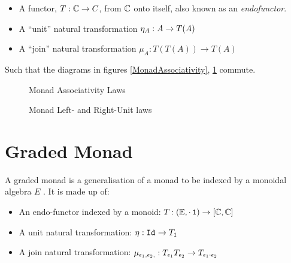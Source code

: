 \documentclass{Report}
\begin{document}
\begin{itemize}
    \item A functor, $T: \mathbb{C} \rightarrow C$, from $\mathbb{C}$ onto itself, also known as an \textit{endofunctor}.
    \item A ``unit'' natural transformation $\eta_{A}: A\rightarrow T(A)$
    \item A ``join'' natural transformation $\mu_{A}: T(T(A)) \rightarrow T(A)$
\end{itemize}

Such that the diagrams in figures \ref{MonadAssociativity}, \ref{MonadUnits} commute.


\begin{figure}
    \centering
    \begin{minipage}{0.45\textwidth}
        \label{MonadAssociativity}
        \centering
                \caption{Monad Associativity Laws}
    \end{minipage}\hfill
    \begin{minipage}{0.45\textwidth}
        \centering
        \label{MonadUnits}
        \caption{Monad Left- and Right-Unit laws}
    \end{minipage}
\end{figure}




\section{Graded Monad}

A graded monad is a generalisation of a monad to be indexed by a monoidal algebra $E$ . It is made up of:

\begin{itemize}
    \item An endo-functor indexed by a monoid: $T_{}{}: (\mathbb{E}, \cdot\, \texttt{1})  \rightarrow [\mathbb{C}, \mathbb{C}]$
    \item A unit natural transformation: $\eta_{}: \texttt{Id}_{} \rightarrow T_{\texttt{1}}{}$
    \item A join natural transformation: $\mu_{\epsilon_1, \epsilon_2, }: T_{\epsilon_1}{T_{\epsilon_2}{}} \rightarrow T_{\epsilon_1 \cdot \epsilon_2}{}$
\end{itemize}
\end{document}
